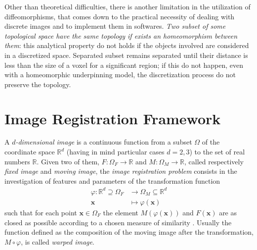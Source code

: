 
Other than theoretical difficulties, there is another limitation in the utilization of diffeomorphisms, that comes down to the practical necessity of dealing with discrete images and to implement them in softwares. \emph{Two subset of some topological space have the same topology if exists an homeomorphism between them}: this analytical property do not holds if the objects involved are considered in a discretized space. Separated subset remains separated until their distance is less than the size of a voxel for a significant region; if this do not happen, even with a homeomorphic underpinning model, the discretization process do not preserve the topology.



\section{Image Registration Framework}\label{se:registration_framework}

A \emph{$d$-dimensional image} is a continuous function from a subset $\Omega$ of the coordinate space $\mathbb{R}^{d}$ (having in mind particular cases $d=2,3$) to the set of real numbers $\mathbb{R}$. Given two of them, $F : \Omega_{F}  \rightarrow\mathbb{R} $ and $M : \Omega_{M}  \rightarrow\mathbb{R} $, called respectively \emph{fixed image} and \emph{moving image}, the \emph{image registration problem} consists in the investigation of features and parameters of the transformation function
\begin{align*}
\varphi :\mathbb{R}^{d} \supseteq \Omega_{F} & \longrightarrow \Omega_{M}\subseteq \mathbb{R}^{d}   \\
\mathbf{x} &\longmapsto \varphi (\mathbf{x}) 
\end{align*}
such that for each point $\mathbf{x}\in \Omega_{F} $ the element $M(\varphi (\mathbf{x}))$ and $F(\mathbf{x})$ are as closed as possible according to a chosen measure of similarity \cite{trouve1998diffeomorphisms}. Usually the function defined as the composition of the moving image after the transformation, $M\circ\varphi $, is called \emph{warped image}.

